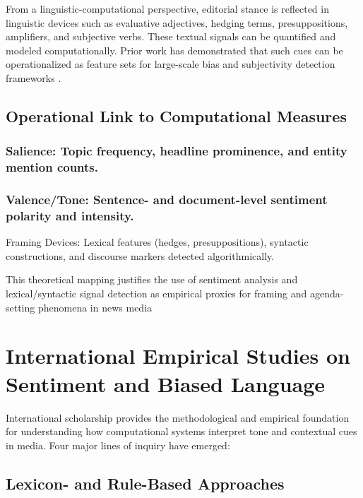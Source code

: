 From a linguistic-computational perspective, editorial stance is reflected in linguistic devices such as evaluative adjectives, hedging terms, presuppositions, amplifiers, and subjective verbs. These textual signals can be quantified and modeled computationally. Prior work has demonstrated that such cues can be operationalized as feature sets for large-scale bias and subjectivity detection frameworks \cite{ref20}.

\subsection{Operational Link to Computational Measures}
\label{operational-link-to-computational-measures}

\subsubsection{Salience: Topic frequency, headline prominence, and entity mention counts.}\label{salience-topic-frequency-headline-prominence-and-entity-mention-counts.}

\subsubsection{Valence/Tone: Sentence- and document-level sentiment polarity and intensity.}\label{valencetone-sentence--and-document-level-sentiment-polarity-and-intensity.}

Framing Devices: Lexical features (hedges, presuppositions), syntactic constructions, and discourse markers detected algorithmically.



This theoretical mapping justifies the use of sentiment analysis and lexical/syntactic signal detection as empirical proxies for framing and agenda-setting phenomena in news media



\section{International Empirical Studies on Sentiment and Biased Language}\label{international-empirical-studies-on-sentiment-and-biased-language}

International scholarship provides the methodological and empirical foundation for understanding how computational systems interpret tone and contextual cues in media. Four major lines of inquiry have emerged:

\subsection{Lexicon- and Rule-Based Approaches}
\label{lexicon--and-rule-based-approaches}

